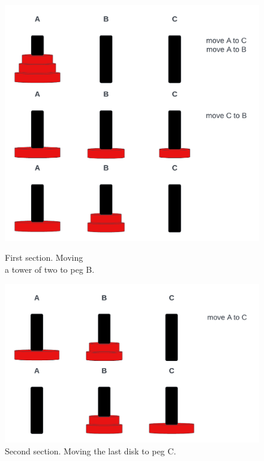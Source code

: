 \documentclass[a4paper,11pt]{article}
\begin{document}
\begin{figure}[ht]
    \begin{minipage}[b]{.45\textwidth}
    \centering
    \includegraphics[width=1\textwidth]{hanoi-first-segment.png}
    \caption{First section. Moving \\a tower of two to peg B.}
    \label{fig:first}
    \end{minipage}
    \hfill
    \begin{minipage}[b]{.55\textwidth}
    \centering
    \includegraphics[width=1\textwidth]{hanoi-second-segment.png}
    \caption{Second section. Moving the last disk to peg C.}
    \label{fig:second}
    \end{minipage}

\end{figure}
\end{document}
